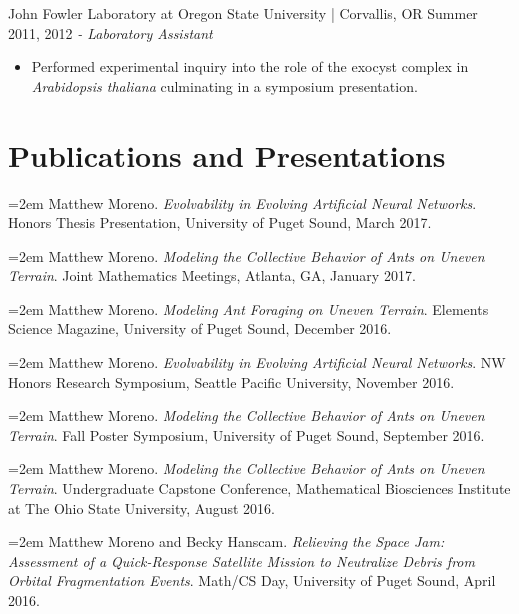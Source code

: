 \documentclass[letter]{res}
\begin{document}
\begin{resume}
 John Fowler Laboratory at Oregon State University | Corvallis, OR \hfill Summer 2011, 2012 \newline
\textit{- Laboratory Assistant} \\
 \vspace{-4.5mm}
 \begin{itemize}
 \item Performed experimental inquiry into the role of the exocyst complex in \textit{Arabidopsis thaliana} culminating in a symposium presentation.
 \end{itemize}
  \vspace{-3.5mm}
  
\section{Publications and Presentations} 
\hangindent=2em
Matthew Moreno. \textit{Evolvability in Evolving Artificial Neural Networks}. Honors Thesis Presentation, University of Puget Sound, March 2017. 

\vspace {-3.5 mm}

\hangindent=2em
Matthew Moreno. \textit{Modeling the Collective Behavior of Ants on Uneven Terrain}. Joint Mathematics Meetings, Atlanta, GA, January 2017. 

\vspace {-3.5 mm}
\hangindent=2em
Matthew Moreno. \textit{Modeling Ant Foraging on Uneven Terrain}. Elements Science Magazine, University of Puget Sound, December 2016. 

\vspace {-3.5 mm}
\hangindent=2em
Matthew Moreno. \textit{Evolvability in Evolving Artificial Neural Networks}. NW Honors Research Symposium, Seattle Pacific University, November 2016. 

\vspace {-3.5 mm}
\hangindent=2em
Matthew Moreno. \textit{Modeling the Collective Behavior of Ants on Uneven Terrain}. Fall Poster Symposium, University of Puget Sound, September 2016. 

\vspace {-3.5 mm}
\hangindent=2em
Matthew Moreno. \textit{Modeling the Collective Behavior of Ants on Uneven Terrain}. Undergraduate Capstone Conference, Mathematical Biosciences Institute at The Ohio State University, August 2016. 

\vspace {-3.5 mm}
\hangindent=2em
Matthew Moreno and Becky Hanscam. \textit{Relieving the Space Jam: Assessment of
a Quick-Response Satellite Mission to Neutralize Debris from Orbital Fragmentation Events}. Math/CS Day, University of Puget Sound, April 2016. 


\end{resume}
\end{document}

